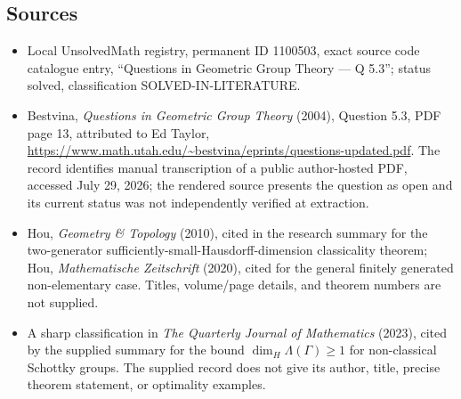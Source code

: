 \documentclass[11pt]{article}
\begin{document}
\subsection{Sources}
\begin{itemize}
\item Local UnsolvedMath registry, permanent ID 1100503, exact source code catalogue entry, ``Questions in Geometric Group Theory --- Q 5.3''; status solved, classification SOLVED-IN-LITERATURE.
\item Bestvina, \emph{Questions in Geometric Group Theory} (2004), Question 5.3, PDF page 13, attributed to Ed Taylor, \url{https://www.math.utah.edu/~bestvina/eprints/questions-updated.pdf}. The record identifies manual transcription of a public author-hosted PDF, accessed July 29, 2026; the rendered source presents the question as open and its current status was not independently verified at extraction.
\item Hou, \emph{Geometry \& Topology} (2010), cited in the research summary for the two-generator sufficiently-small-Hausdorff-dimension classicality theorem; Hou, \emph{Mathematische Zeitschrift} (2020), cited for the general finitely generated non-elementary case. Titles, volume/page details, and theorem numbers are not supplied.
\item A sharp classification in \emph{The Quarterly Journal of Mathematics} (2023), cited by the supplied summary for the bound $\dim_H\Lambda(\Gamma)\geq1$ for non-classical Schottky groups. The supplied record does not give its author, title, precise theorem statement, or optimality examples.
\end{itemize}
\end{document}
